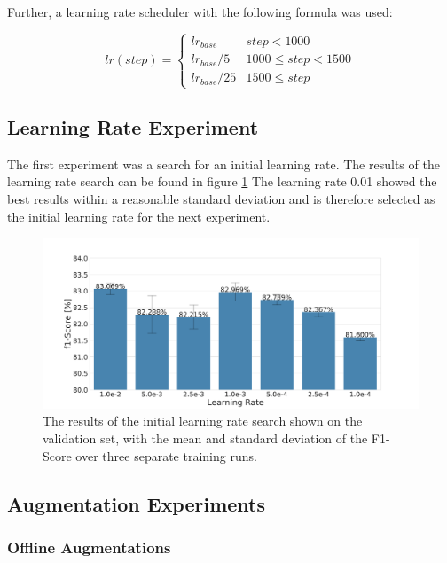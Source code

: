 Further, a learning rate scheduler with the following formula was used:

\begin{equation}
    lr(step) =
    \begin{cases}
        lr_{base}      &  step < 1000 \\
        lr_{base} / 5  & 1000 \leq step < 1500 \\
        lr_{base} / 25 & 1500 \leq step
    \end{cases}
\end{equation}

\subsection{Learning Rate Experiment}

The first experiment was a search for an initial learning rate.
The results of the learning rate search can be found in figure \ref{fig:munet_lr_exp}
The learning rate 0.01 showed the best results within a reasonable standard deviation and is therefore selected as the initial learning rate for the next experiment.

\begin{figure}[t!]
\begin{center}
    \includegraphics[width=12cm]{imgs/munet_lr_exp.pdf}
    \caption{The results of the initial learning rate search shown on the validation set, with the mean and standard deviation of the F1-Score over three separate training runs.}
    \label{fig:munet_lr_exp}
\end{center}
\end{figure}


\subsection{Augmentation Experiments}

\subsubsection{Offline Augmentations}


